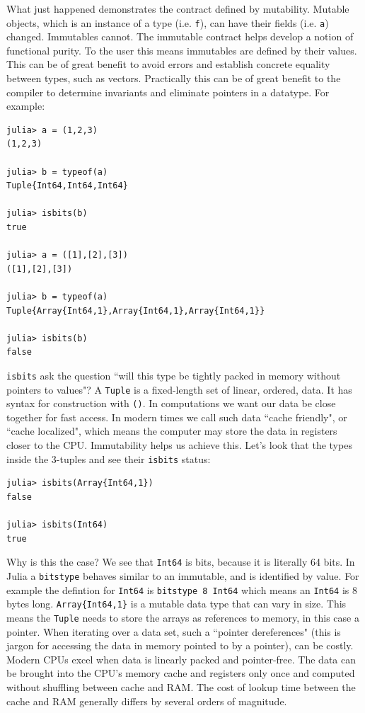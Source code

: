 What just happened demonstrates the contract defined by mutability. Mutable
objects, which is an instance of a type (i.e. \texttt{f}), can have their fields
(i.e. \texttt{a}) changed. Immutables cannot. The immutable contract helps develop
a notion of functional purity. To the user this means immutables are defined
by their values. This can be of great benefit to avoid errors and establish
concrete equality between types, such as vectors.
Practically this can be of great benefit to
the compiler to determine invariants and eliminate pointers in a datatype.
For example:
\begin{lstlisting}
julia> a = (1,2,3)
(1,2,3)

julia> b = typeof(a)
Tuple{Int64,Int64,Int64}

julia> isbits(b)
true

julia> a = ([1],[2],[3])
([1],[2],[3])

julia> b = typeof(a)
Tuple{Array{Int64,1},Array{Int64,1},Array{Int64,1}}

julia> isbits(b)
false
\end{lstlisting}

\texttt{isbits} ask the question ``will this type be tightly packed in memory
without pointers to values"? A
\texttt{Tuple} is a fixed-length set of linear, ordered, data. It has syntax for
construction with \texttt{()}. In computations we want our data be close together
for fast access. In modern times we call such data ``cache friendly", or
``cache localized", which means the computer may store the data in
registers closer to the CPU.
Immutability helps us achieve this. Let's look that the
types inside the 3-tuples and see their \texttt{isbits} status:
\begin{lstlisting}
julia> isbits(Array{Int64,1})
false

julia> isbits(Int64)
true
\end{lstlisting}
Why is this the case? We see that \texttt{Int64} is bits, because it is literally
64 bits. In Julia a \texttt{bitstype} behaves similar to an immutable, and is identified
by value. For example the defintion for \texttt{Int64} is \texttt{bitstype 8 Int64}
which means an \texttt{Int64} is 8 bytes long.
\texttt{Array\{Int64,1\}} is a mutable data type that can vary in size.
This means
the \texttt{Tuple} needs to store the arrays as references to memory,
in this case a
pointer. When iterating over a data set, such a ``pointer dereferences" (this is
jargon for accessing the data in memory pointed to by a pointer), can be costly.
Modern CPUs excel when data is linearly packed and pointer-free. The
data can be brought into the CPU's memory cache and registers only once
and computed without
shuffling between cache and RAM. The cost of lookup time between the cache and
RAM generally differs by several orders of magnitude.

